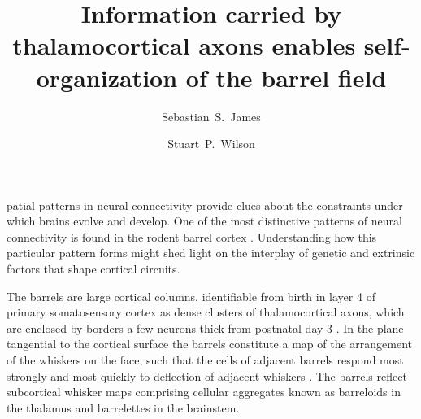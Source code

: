 \documentclass[9pt,twocolumn,twoside,lineno]{pnas-new}
\title{Information carried by thalamocortical axons enables self-organization of the barrel field}
\author[a,1]{Sebastian~S.~James}
\author[a]{Stuart~P.~Wilson}
\affil[a]{Department of Psychology, The University of Sheffield, Sheffield, United Kingdom.}
\begin{document}
\newcommand{\cmnt}[1]{\textcolor{blue}{#1}}
\newcommand{\dvrg}{\nabla\vcdot\nabla}
\newcommand{\e}{\emph}
\newcommand{\bol}{\textbf}
\newcommand{\mb}[1]{\mathbf{#1}}
\makeatletter
\newcommand*\vcdot{\mathpalette\vcdot@{.35}}
\newcommand*\vcdot@[2]{\mathbin{\vcenter{\hbox{\scalebox{#2}{$\m@th#1\bullet$}}}}}
\makeatother

\maketitle
\thispagestyle{firststyle}

\modulolinenumbers{}
\linenumbers

patial patterns in neural connectivity provide clues about the
constraints under which brains evolve and develop.
One of the most
distinctive patterns of neural connectivity is found in the rodent
barrel cortex \cite{woolsey_structural_1970}.
Understanding how this particular pattern forms might shed light on the
interplay of genetic and extrinsic factors that shape cortical circuits.

The barrels are large cortical columns, identifiable from birth in layer 4 of
primary somatosensory cortex as dense clusters of thalamocortical axons, which
are enclosed by borders a few neurons thick from postnatal day 3
\citep{erzurumlu_development_2012}. In the plane tangential to the cortical
surface the barrels constitute a map of the arrangement of the whiskers on the
face,
such that the cells of adjacent barrels respond most strongly and most quickly
to deflection of adjacent whiskers \citep{armstrong-james_flow_1992}. The
barrels reflect subcortical whisker maps comprising cellular aggregates known
as barreloids in the thalamus \cite{van_der_loos_barreloids_1976} and
barrelettes in the brainstem.
\end{document}
